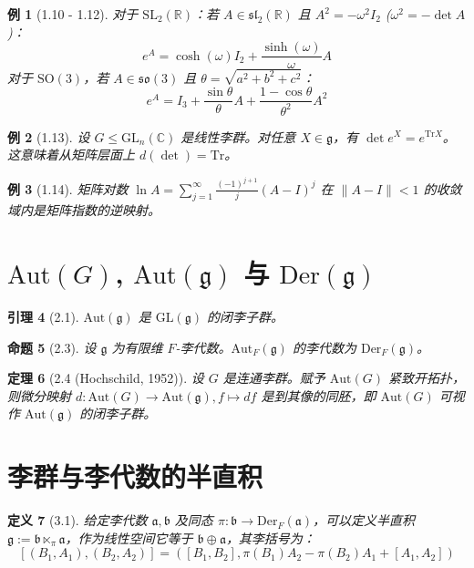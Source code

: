 \documentclass[12pt, a4paper]{ctexart}
\newtheorem{theorem}{定理}[section]
\newtheorem{proposition}[theorem]{命题}
\newtheorem{lemma}[theorem]{引理}
\newtheorem{definition}[theorem]{定义}
\newtheorem{example}[theorem]{例}
\begin{document}
\begin{example}[1.10 - 1.12]
对于 $\mathrm{SL}_2(\mathbb{R})$：若 $A \in \mathfrak{sl}_2(\mathbb{R})$ 且 $A^2 = -\omega^2 I_2$ ($\omega^2 = -\det A$)：
$$ e^A = \cosh(\omega) I_2 + \frac{\sinh(\omega)}{\omega} A $$
对于 $\mathrm{SO}(3)$，若 $A \in \mathfrak{so}(3)$ 且 $\theta = \sqrt{a^2+b^2+c^2}$：
$$ e^A = I_3 + \frac{\sin\theta}{\theta} A + \frac{1-\cos\theta}{\theta^2} A^2 $$
\end{example}

\begin{example}[1.13]
设 $G \le \mathrm{GL}_n(\mathbb{C})$ 是线性李群。对任意 $X \in \mathfrak{g}$，有 $\det e^X = e^{\mathrm{Tr}X}$。这意味着从矩阵层面上 $d(\det) = \mathrm{Tr}$。
\end{example}

\begin{example}[1.14]
矩阵对数 $\ln A = \sum_{j=1}^\infty \frac{(-1)^{j+1}}{j}(A-I)^j$ 在 $\|A-I\| < 1$ 的收敛域内是矩阵指数的逆映射。
\end{example}

\section{$\mathrm{Aut}(G)$, $\mathrm{Aut}(\mathfrak{g})$ 与 $\mathrm{Der}(\mathfrak{g})$}

\begin{lemma}[2.1]
$\mathrm{Aut}(\mathfrak{g})$ 是 $\mathrm{GL}(\mathfrak{g})$ 的闭李子群。
\end{lemma}

\begin{proposition}[2.3]
设 $\mathfrak{g}$ 为有限维 $F$-李代数。$\mathrm{Aut}_F(\mathfrak{g})$ 的李代数为 $\mathrm{Der}_F(\mathfrak{g})$。
\end{proposition}

\begin{theorem}[2.4 (Hochschild, 1952)]
设 $G$ 是连通李群。赋予 $\mathrm{Aut}(G)$ 紧致开拓扑，则微分映射 $d: \mathrm{Aut}(G) \to \mathrm{Aut}(\mathfrak{g}), f \mapsto df$ 是到其像的同胚，即 $\mathrm{Aut}(G)$ 可视作 $\mathrm{Aut}(\mathfrak{g})$ 的闭李子群。
\end{theorem}

\section{李群与李代数的半直积}

\begin{definition}[3.1]
给定李代数 $\mathfrak{a}, \mathfrak{b}$ 及同态 $\pi: \mathfrak{b} \to \mathrm{Der}_F(\mathfrak{a})$，可以定义半直积 $\mathfrak{g} := \mathfrak{b} \ltimes_\pi \mathfrak{a}$，作为线性空间它等于 $\mathfrak{b} \oplus \mathfrak{a}$，其李括号为：
$$ [(B_1, A_1), (B_2, A_2)] = ([B_1, B_2], \pi(B_1)A_2 - \pi(B_2)A_1 + [A_1, A_2]) $$
\end{definition}
\end{document}
